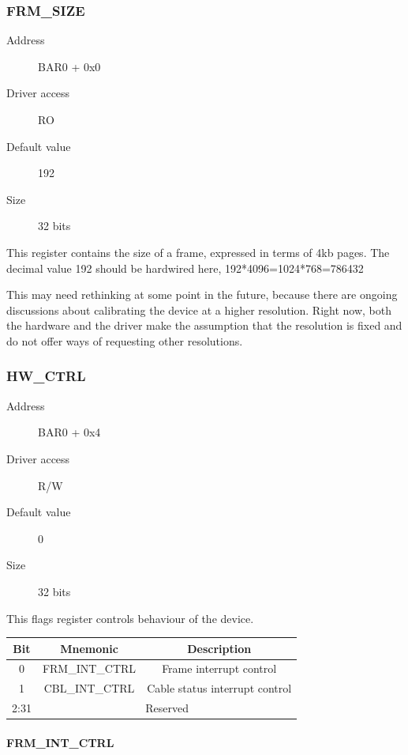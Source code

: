 \documentclass[12pt]{article}
\begin{document}
\subsubsection{FRM\_SIZE}

\begin{description}
\item[Address] BAR0 + 0x0
\item[Driver access] RO
\item[Default value] 192
\item[Size] 32 bits
\end{description}

This register contains the size of a frame, expressed in terms of 4kb pages. The decimal value 192 should be hardwired here, 192*4096=1024*768=786432

This may need rethinking at some point in the future, because there are ongoing discussions about calibrating the device at a higher resolution. Right now, both the hardware and the driver make the assumption that the resolution is fixed and do not offer ways of requesting other resolutions.

\subsubsection{HW\_CTRL}

\begin{description}
\item[Address] BAR0 + 0x4
\item[Driver access] R/W
\item[Default value] 0
\item[Size] 32 bits
\end{description}

This flags register controls behaviour of the device.

\begin{tabular}{|c|c|c|}\hline
\textbf{Bit} & \textbf{Mnemonic} & \textbf{Description} \\ \hline
0 & FRM\_INT\_CTRL & Frame interrupt control \\ \hline
1 & CBL\_INT\_CTRL & Cable status interrupt control \\ \hline
2:31 & \multicolumn{2}{|c|}{Reserved} \\ \hline
\end{tabular}

\paragraph{FRM\_INT\_CTRL}
\end{document}
